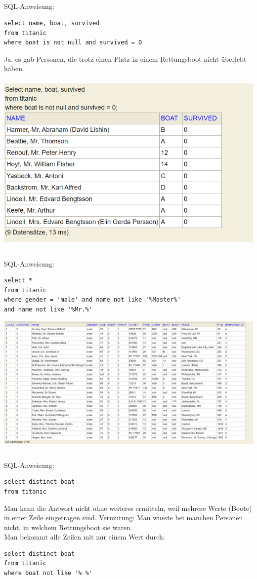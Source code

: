 \documentclass[a4paper, 11pt, titlepage]{article}
\begin{document}
\subsection{}
SQL-Anweisung:
\begin{lstlisting}
select name, boat, survived
from titanic
where boat is not null and survived = 0
\end{lstlisting}
Ja, es gab Personen, die trotz einen Platz in einem Rettungsboot nicht überlebt haben\\
\\
\includegraphics [width = 10 cm] {i}
\newpage
\subsection{}
SQL-Anweisung:
\begin{lstlisting}
select *
from titanic
where gender = 'male' and name not like '%Master%' 
and name not like '%Mr.%'
\end{lstlisting}
\includegraphics [width = 15 cm] {j}
\subsection{}
SQL-Anweisung:
\begin{lstlisting}
select distinct boat
from titanic
\end{lstlisting}
Man kann die Antwort nicht ohne weiteres ermitteln, weil mehrere Werte (Boote) in einer Zeile eingetragen sind. Vermutung: Man wusste bei manchen Personen nicht, in welchem Rettungsboot sie waren.\\
Man bekommt alle Zeilen mit nur einem Wert durch:\\
\begin{lstlisting}
select distinct boat
from titanic
where boat not like '% %'
\end{lstlisting}
\end{document}

